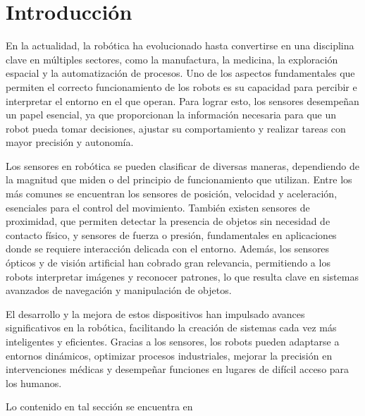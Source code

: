 \section{Introducción}
En la actualidad, la robótica ha evolucionado hasta convertirse en una disciplina clave en múltiples sectores, como la manufactura, la medicina, la exploración espacial y la automatización de procesos. Uno de los aspectos fundamentales que permiten el correcto funcionamiento de los robots es su capacidad para percibir e interpretar el entorno en el que operan. Para lograr esto, los sensores desempeñan un papel esencial, ya que proporcionan la información necesaria para que un robot pueda tomar decisiones, ajustar su comportamiento y realizar tareas con mayor precisión y autonomía.

Los sensores en robótica se pueden clasificar de diversas maneras, dependiendo de la magnitud que miden o del principio de funcionamiento que utilizan. Entre los más comunes se encuentran los sensores de posición, velocidad y aceleración, esenciales para el control del movimiento. También existen sensores de proximidad, que permiten detectar la presencia de objetos sin necesidad de contacto físico, y sensores de fuerza o presión, fundamentales en aplicaciones donde se requiere interacción delicada con el entorno. Además, los sensores ópticos y de visión artificial han cobrado gran relevancia, permitiendo a los robots interpretar imágenes y reconocer patrones, lo que resulta clave en sistemas avanzados de navegación y manipulación de objetos.

El desarrollo y la mejora de estos dispositivos han impulsado avances significativos en la robótica, facilitando la creación de sistemas cada vez más inteligentes y eficientes. Gracias a los sensores, los robots pueden adaptarse a entornos dinámicos, optimizar procesos industriales, mejorar la precisión en intervenciones médicas y desempeñar funciones en lugares de difícil acceso para los humanos.

Lo contenido en tal sección se encuentra en \cite{MagnetometroMundo}